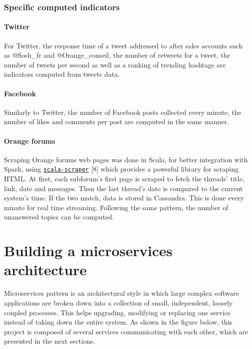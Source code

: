 \documentclass[11pt]{article}
\begin{document}
\subsubsection{Specific computed indicators}

\paragraph{Twitter}

For \textsf{Twitter}, the response time of a tweet addressed to after sales accounts such as \textsf{@Sosh\_fr} and \textsf{@Orange\_conseil}, the number of retweets for a tweet, the number of tweets per second as well as a ranking of trending hashtags are indicators computed from tweets data.

\paragraph{Facebook}

Similarly to \textsf{Twitter}, the number of \textsf{Facebook} posts collected every minute, the number of likes and comments per post are computed in the same manner.

\paragraph{Orange forums}

Scraping \textsf{Orange} forums web pages was done in \textsf{Scala}, for better integration with \textsf{Spark}, using \href{https://github.com/ruippeixotog/scala-scraper}{\texttt{scala-scraper}} [8] which provides a powerful library for scraping \textsf{HTML}. At first, each subforum's first page is scraped to fetch the threads' title, link, date and messages. Then the last thread's date is compared to the current system's time. If the two match, data is stored in \textsf{Cassandra}. This is done every minute for real time streaming. Following the same pattern, the number of unanswered topics can be computed. 

\section{Building a microservices architecture}


Microservices pattern is an architectural style in which large complex software applications are broken down into a collection of small, independent, loosely coupled processes. This helps upgrading, modifying or replacing one service instead of taking down the entire system. As shown in the figure below, this project is composed of several services communicating with each other, which are presented in the next sections.
\end{document}
